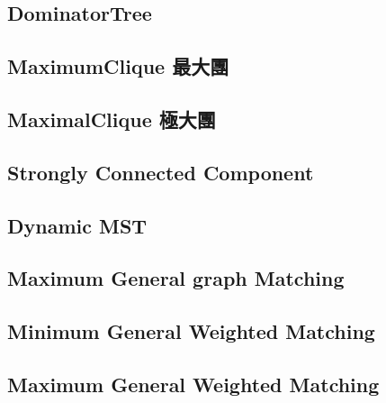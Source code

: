 \documentclass[a4paper,10pt,twocolumn,oneside]{article}
\begin{document}
\subsection{DominatorTree}


\subsection{MaximumClique 最大團}
% 


\subsection{MaximalClique 極大團}
% 


%

\subsection{Strongly Connected Component}


\subsection{Dynamic MST}


\subsection{Maximum General graph Matching}


\subsection{Minimum General Weighted Matching}


\subsection{Maximum General Weighted Matching}

\end{document}
